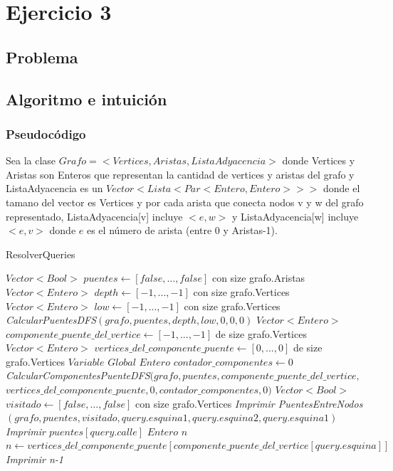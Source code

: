 \section{Ejercicio 3}

\subsection{Problema}

\subsection{Algoritmo e intuición}

\subsubsection*{Pseudocódigo}

Sea la clase $Grafo = <Vertices, Aristas, ListaAdyacencia>$
	donde Vertices y Aristas son Enteros que representan la cantidad de vertices y aristas del grafo y
	ListaAdyacencia es un $Vector<Lista<Par<Entero, Entero>>>$ donde
	el tamano del vector es Vertices y por cada arista que conecta nodos v 
	y w del grafo representado, ListaAdyacencia[v] incluye $<e, w>$ y
	ListaAdyacencia[w] incluye $<e, v>$ donde $e$ es el número de arista (entre 0 y Aristas-1).

\begin{algorithm}[]
    \caption{ResolverQueries}
    $Vector<Bool>$ $puentes \gets [false,...,false]$ con size grafo.Aristas \;
	$Vector<Entero>$ $depth \gets [-1,...,-1]$ con size grafo.Vertices \;
	$Vector<Entero>$ $low \gets [-1,...,-1]$ con size grafo.Vertices \;
	\emph{CalcularPuentesDFS$(grafo, puentes, depth, low, 0, 0, 0)$} \;
	$Vector<Entero>$ $componente\_puente\_del\_vertice \gets [-1,...,-1]$ de size grafo.Vertices \;
	$Vector<Entero>$ $vertices\_del\_componente\_puente \gets [0,...,0]$ de size grafo.Vertices \;
	$Variable$ $Global$ $Entero$ $contador\_componentes \gets 0$ \;
	\emph{CalcularComponentesPuenteDFS$(grafo, puentes, componente\_puente\_del\_vertice, $ $ vertices\_del\_componente\_puente, 0, contador\_componentes, 0)$} \;
	 {
		 {
			$Vector<Bool>$ $visitado \gets [false,...,false]$ con size grafo.Vertices \;
			\emph{Imprimir PuentesEntreNodos$(grafo, puentes, visitado, query.esquina1, query.esquina2, query.esquina1)$}
		}
		 {
			\emph{Imprimir $puentes[query.calle]$}
		}
		 {
			$Entero$ $n$ \;
			$n \gets vertices\_del\_componente\_puente[componente\_puente\_del\_vertice[query.esquina]]$ \;
			\emph{Imprimir n-1}
		}
	}
\end{algorithm}


